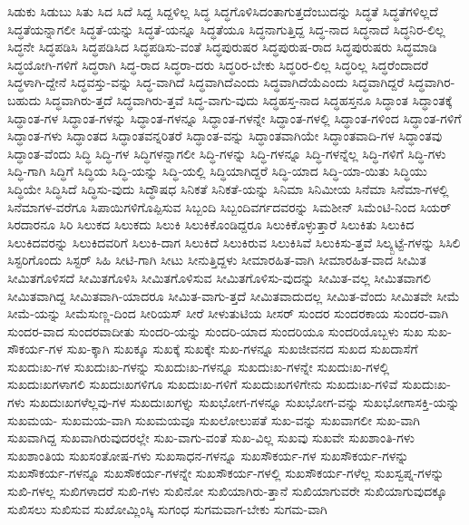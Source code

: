 {ಸಿಡುಕು
ಸಿಡುಬು
ಸಿತು
ಸಿದ
ಸಿದೆ
ಸಿದ್ದ
ಸಿದ್ದಳಿಲ್ಲ
ಸಿದ್ಧ
ಸಿದ್ಧಗೊಳಿಸಿದಂತಾಗುತ್ತದೆಂಬುದನ್ನು
ಸಿದ್ಧತೆ
ಸಿದ್ಧತೆಗಳಿಲ್ಲದೆ
ಸಿದ್ಧತೆಯನ್ನಾಗಲೀ
ಸಿದ್ಧತೆ-ಯನ್ನು
ಸಿದ್ಧತೆ-ಯನ್ನೂ
ಸಿದ್ಧತೆಯೂ
ಸಿದ್ಧನಾಗುತ್ತಿದ್ದ
ಸಿದ್ಧ-ನಾದ
ಸಿದ್ಧನಾದೆ
ಸಿದ್ಧನಿರ-ಲಿಲ್ಲ
ಸಿದ್ಧನೇ
ಸಿದ್ಧಪಡಿಸಿ
ಸಿದ್ಧಪಡಿಸಿದ
ಸಿದ್ಧಪಡಿಸು-ವಂತೆ
ಸಿದ್ಧಪುರುಷರ
ಸಿದ್ಧಪುರುಷ-ರಾದ
ಸಿದ್ಧಪುರುಷರು
ಸಿದ್ಧಮಾಡಿ
ಸಿದ್ಧಯೋಗಿ-ಗಳಿಗೆ
ಸಿದ್ಧರಾಗಿ
ಸಿದ್ಧ-ರಾದ
ಸಿದ್ಧರಾ-ದರು
ಸಿದ್ಧರಿರ-ಬೇಕು
ಸಿದ್ಧರಿರ-ಲಿಲ್ಲ
ಸಿದ್ಧರಿಲ್ಲ
ಸಿದ್ಧರೆಂದಾದರೆ
ಸಿದ್ಧಳಾಗಿ-ದ್ದೇನೆ
ಸಿದ್ಧವಸ್ತು-ವನ್ನು
ಸಿದ್ಧ-ವಾಗಿದೆ
ಸಿದ್ಧವಾಗಿದೆಎಂದು
ಸಿದ್ಧವಾಗಿದೆಯೆಎಂದು
ಸಿದ್ಧವಾಗಿದ್ದರೆ
ಸಿದ್ಧವಾಗಿರ-ಬಹುದು
ಸಿದ್ಧವಾಗಿರು-ತ್ತದೆ
ಸಿದ್ಧವಾಗಿರು-ತ್ತವೆ
ಸಿದ್ಧ-ವಾಗು-ವುದು
ಸಿದ್ಧಹಸ್ತ-ನಾದ
ಸಿದ್ಧಹಸ್ತನೂ
ಸಿದ್ಧಾಂತ
ಸಿದ್ಧಾಂತಕ್ಕೆ
ಸಿದ್ಧಾಂತ-ಗಳ
ಸಿದ್ಧಾಂತ-ಗಳನ್ನು
ಸಿದ್ಧಾಂತ-ಗಳನ್ನೂ
ಸಿದ್ಧಾಂತ-ಗಳನ್ನೇ
ಸಿದ್ಧಾಂತ-ಗಳಲ್ಲಿ
ಸಿದ್ಧಾಂತ-ಗಳಿಂದ
ಸಿದ್ಧಾಂತ-ಗಳಿಗೆ
ಸಿದ್ಧಾಂತ-ಗಳು
ಸಿದ್ಧಾಂತದ
ಸಿದ್ಧಾಂತವನ್ನರಿತರೆ
ಸಿದ್ಧಾಂತ-ವನ್ನು
ಸಿದ್ಧಾಂತವಾಗಿಯೇ
ಸಿದ್ಧಾಂತವಾದಿ-ಗಳ
ಸಿದ್ಧಾಂತವು
ಸಿದ್ಧಾಂತ-ವೆಂದು
ಸಿದ್ಧಿ
ಸಿದ್ಧಿ-ಗಳ
ಸಿದ್ಧಿಗಳನ್ನಾಗಲೀ
ಸಿದ್ಧಿ-ಗಳನ್ನು
ಸಿದ್ಧಿ-ಗಳನ್ನೂ
ಸಿದ್ಧಿ-ಗಳನ್ನೆಲ್ಲ
ಸಿದ್ಧಿ-ಗಳಿಗೆ
ಸಿದ್ಧಿ-ಗಳು
ಸಿದ್ಧಿ-ಗಾಗಿ
ಸಿದ್ಧಿಗೆ
ಸಿದ್ಧಿಯ
ಸಿದ್ಧಿ-ಯನ್ನು
ಸಿದ್ಧಿ-ಯಲ್ಲಿ
ಸಿದ್ಧಿಯಾಗಿದ್ದರೆ
ಸಿದ್ಧಿ-ಯಾದ
ಸಿದ್ಧಿ-ಯಾ-ಯಿತು
ಸಿದ್ಧಿಯು
ಸಿದ್ಧಿಯೇ
ಸಿದ್ಧಿಸಿದೆ
ಸಿದ್ಧಿಸು-ವುದು
ಸಿದ್ಧೌಷಧ
ಸಿನಿಕತೆ
ಸಿನಿಕತೆ-ಯನ್ನು
ಸಿನಿಮಾ
ಸಿನಿಮೀಯ
ಸಿನೆಮಾ
ಸಿನೆಮಾ-ಗಳಲ್ಲಿ
ಸಿನೆಮಾಗಳ-ವರೆಗೂ
ಸಿಪಾಯಿಗಳಿಗೊಪ್ಪಿಸುವ
ಸಿಬ್ಬಂದಿ
ಸಿಬ್ಬಂದಿವರ್ಗದವರನ್ನು
ಸಿಮಶೀನ್
ಸಿಮೆಂಟಿ-ನಿಂದ
ಸಿಯರ್
ಸಿರದಾರನೂ
ಸಿರಿ
ಸಿಲುಕದ
ಸಿಲುಕದು
ಸಿಲುಕಿ
ಸಿಲುಕಿಕೊಂಡಿದ್ದರೂ
ಸಿಲುಕಿಕೊಳ್ಳುತ್ತಾರೆ
ಸಿಲುಕಿತು
ಸಿಲುಕಿದ
ಸಿಲುಕಿದವರನ್ನು
ಸಿಲುಕಿದವರಿಗೆ
ಸಿಲುಕಿ-ದಾಗ
ಸಿಲುಕಿದೆ
ಸಿಲುಕಿರುವ
ಸಿಲುಕಿಸಿವೆ
ಸಿಲುಕಿಸು-ತ್ತವೆ
ಸಿಲ್ಕ್ಬಟ್ಟೆ-ಗಳನ್ನು
ಸಿಸಿಲಿ
ಸಿಸ್ಟರಿಗೊಂದು
ಸಿಸ್ಟರ್
ಸಿಹಿ
ಸೀಟಿ-ಗಾಗಿ
ಸೀಟು
ಸೀನುತ್ತಿದ್ದಳು
ಸೀಮಾರಹಿತ-ವಾಗಿ
ಸೀಮಾರಹಿತ-ವಾದ
ಸೀಮಿತ
ಸೀಮಿತಗೊಳಿಸದೆ
ಸೀಮಿತಗೊಳಿಸಿ
ಸೀಮಿತಗೊಳಿಸುವ
ಸೀಮಿತಗೊಳಿಸು-ವುದನ್ನು
ಸೀಮಿತ-ವಲ್ಲ
ಸೀಮಿತವಾಗಲಿ
ಸೀಮಿತವಾಗಿದ್ದ
ಸೀಮಿತವಾಗಿ-ಯಾದರೂ
ಸೀಮಿತ-ವಾಗು-ತ್ತದೆ
ಸೀಮಿತವಾದುದಲ್ಲ
ಸೀಮಿತ-ವೆಂದು
ಸೀಮಿತವೇ
ಸೀಮೆ
ಸೀಮೆ-ಯನ್ನು
ಸೀಮೆಸುಣ್ಣ-ದಿಂದ
ಸೀರಿಯಸ್
ಸೀರೆ
ಸೀಳುತುಟಿಯ
ಸೀಸರ್
ಸುಂದರ
ಸುಂದರಕಾಯ
ಸುಂದರ-ವಾಗಿ
ಸುಂದರ-ವಾದ
ಸುಂದರವಾದೀತು
ಸುಂದರಿ-ಯನ್ನು
ಸುಂದರಿ-ಯಾದ
ಸುಂದರಿಯೂ
ಸುಂದರಿಯೊಬ್ಬಳು
ಸುಖ
ಸುಖ-ಸೌಕರ್ಯ-ಗಳ
ಸುಖ-ಕ್ಕಾಗಿ
ಸುಖಕ್ಕೂ
ಸುಖಕ್ಕೆ
ಸುಖಕ್ಕೇ
ಸುಖ-ಗಳನ್ನೂ
ಸುಖಜೀವನದ
ಸುಖದ
ಸುಖದಾಸೆಗೆ
ಸುಖದುಃಖ-ಗಳ
ಸುಖದುಃಖ-ಗಳನ್ನು
ಸುಖದುಃಖ-ಗಳನ್ನೂ
ಸುಖದುಃಖ-ಗಳನ್ನೇ
ಸುಖದುಃಖ-ಗಳಲ್ಲಿ
ಸುಖದುಃಖಗಳಾಗಲಿ
ಸುಖದುಃಖಗಳಿಗೂ
ಸುಖದುಃಖ-ಗಳಿಗೆ
ಸುಖದುಃಖಗಳಿಗೇನು
ಸುಖದುಃಖ-ಗಳಿವೆ
ಸುಖದುಃಖ-ಗಳು
ಸುಖದುಃಖಗಳೆಲ್ಲವು-ಗಳ
ಸುಖದುಃಖಗಳ್ನು
ಸುಖಭೋಗ-ಗಳನ್ನೂ
ಸುಖಭೋಗ-ವನ್ನು
ಸುಖಭೋಗಾಸಕ್ತಿ-ಯನ್ನು
ಸುಖಮಯ-
ಸುಖಮಯ-ವಾಗಿ
ಸುಖಮಯವೂ
ಸುಖಲೋಲುಪತೆ
ಸುಖ-ವನ್ನು
ಸುಖವಾಗಲೀ
ಸುಖ-ವಾಗಿ
ಸುಖವಾಗಿದ್ದ
ಸುಖವಾಗಿರುವುದರಲ್ಲೇ
ಸುಖ-ವಾಗು-ವಂತೆ
ಸುಖ-ವಿಲ್ಲ
ಸುಖವು
ಸುಖವೇ
ಸುಖಶಾಂತಿ-ಗಳು
ಸುಖಶಾಂತಿಯ
ಸುಖಸಂತೋಷ-ಗಳು
ಸುಖಸಾಧನ-ಗಳನ್ನೂ
ಸುಖಸೌಕರ್ಯ-ಗಳ
ಸುಖಸೌಕರ್ಯ-ಗಳನ್ನು
ಸುಖಸೌಕರ್ಯ-ಗಳನ್ನೂ
ಸುಖಸೌಕರ್ಯ-ಗಳನ್ನೇ
ಸುಖಸೌಕರ್ಯ-ಗಳಲ್ಲಿ
ಸುಖಸೌಕರ್ಯ-ಗಳೆಲ್ಲ
ಸುಖಸ್ವಪ್ನ-ಗಳನ್ನು
ಸುಖಿ-ಗಳಲ್ಲ
ಸುಖಿಗಳಾದರೆ
ಸುಖಿ-ಗಳು
ಸುಖಿನೋ
ಸುಖಿಯಾಗಿರು-ತ್ತಾನೆ
ಸುಖಿಯಾಗುವರೇ
ಸುಖಿಯಾಗುವುದಕ್ಕೂ
ಸುಖಿಸಲು
ಸುಖಿಸುವ
ಸುಖೋಮ್ಲಿಂಸ್ಕಿ
ಸುಗಂಧ
ಸುಗಮವಾಗ-ಬೇಕು
ಸುಗಮ-ವಾಗಿ
}
